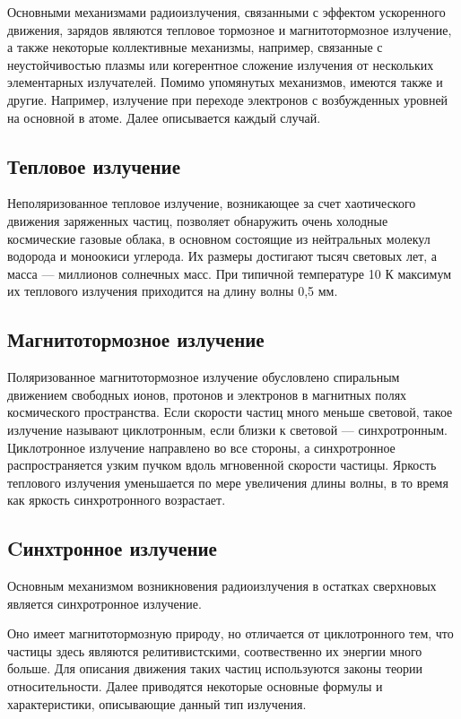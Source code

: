 \documentclass[a4paper,12pt]{extarticle}
\begin{document}
Основными механизмами радиоизлучения, связанными с эффектом ускоренного движения, зарядов являются тепловое тормозное и магнитотормозное излучение, а также некоторые коллективные механизмы, например, связанные с неустойчивостью плазмы или когерентное сложение излучения от нескольких элементарных излучателей. 
Помимо упомянутых механизмов, имеются также и другие. Например, излучение при переходе электронов с возбужденных уровней на основной в атоме. 
Далее описывается каждый случай.

\subsection{Тепловое излучение}  
Неполяризованное тепловое излучение, возникающее за счет хаотического движения заряженных частиц, позволяет обнаружить очень холодные космические газовые облака, в основном состоящие из нейтральных молекул водорода и моноокиси углерода. Их размеры достигают тысяч световых лет, а масса — миллионов солнечных масс. При типичной температуре 10 К максимум их теплового излучения приходится на длину волны 0,5 мм. 

\subsection{Магнитотормозное излучение}
Поляризованное магнитотормозное излучение обусловлено спиральным движением свободных ионов, протонов и электронов в магнитных полях космического пространства. Если скорости частиц много меньше световой, такое излучение называют циклотронным, если близки к световой — синхротронным. Циклотронное излучение направлено во все стороны, а синхротронное распространяется узким пучком вдоль мгновенной скорости частицы. Яркость теплового излучения уменьшается по мере увеличения длины волны, в то время как яркость синхротронного возрастает.

\subsection{Cинхтронное излучение}
\indent Основным механизмом возникновения радиоизлучения в остатках сверхновых является синхротронное излучение.

Оно имеет магнитотормозную природу, но отличается от циклотронного тем, что частицы здесь являются релитивистскими, соотвественно их энергии много больше. 
Для описания движения таких частиц используются законы теории относительности. Далее приводятся некоторые основные формулы и характеристики, описывающие данный тип излучения. 
\end{document}
